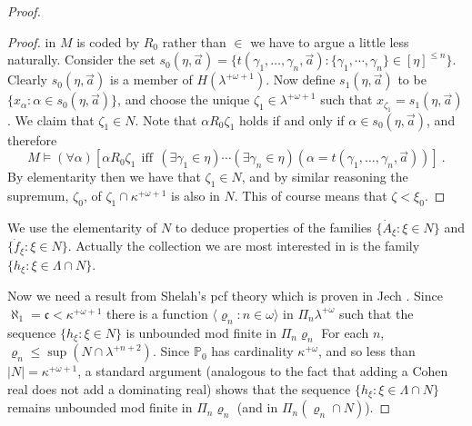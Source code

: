 \documentclass{amsart}
\theoremstyle{plain}
\theoremstyle{definition}
\theoremstyle{remark}
\theoremstyle{plain}
\theoremstyle{definition}
\theoremstyle{remark}
\begin{document}
\begin{proof}
\begin{proof}
             in $M$ is coded by $R_0$ rather than $\in$ we have to argue a little
             less naturally.
             Consider the set
               $s_0(\eta,\vec a) = \{ t(\gamma_1,\ldots, \gamma_n,\vec a) :
            \{\gamma_1,\cdots,\gamma_n\} \in [\eta]^{\leq n}\}$. Clearly
             $s_0(\eta,\vec a)$ is a member of $H(\lambda^{+\omega+1})$.
             Now define $s_1(\eta,\vec a) $ to be
             $\{ x_\alpha : \alpha\in s_0(\eta, \vec a)\}$,
             and choose the
             unique $\zeta_1\in \lambda^{+\omega+1}$ such
             that $x_{\zeta_1} = s_1(\eta,\vec a)$. We claim that $\zeta_1\in N$.
             Note that $\alpha R_0\zeta_1$ holds if and only if
              $ \alpha \in s_0(\eta,\vec a)$, and therefore
             $$M\models (\forall \alpha)\left[\alpha R_0 \zeta_1 ~~\mbox{iff}~~
             (\exists   \gamma_1\in \eta)\cdots(\exists \gamma_n\in\eta)(\alpha=
             t(\gamma_1,\ldots, \gamma_n,\vec a))\right]~.$$
             By elementarity then we have that $\zeta_1\in N$,
             and by similar reasoning the supremum, $\zeta_0$,
            of $\zeta_1\cap \kappa^{+\omega+1}$ is also in $N$.
               This of course means that $\zeta < \xi_0$.
            \end{proof}

            \egroup

            We use the elementarity of
             $N$  to deduce properties of the families
             $\{ \dot A_\xi : \xi\in N\}$ and $\{ \dot f_\xi : \xi \in
             N\}$.  Actually the collection we are most interested in
             is the family $\{ h_\xi : \xi\in \Lambda\cap N\}$.

            Now we need a result from Shelah's pcf theory which
            is proven in  Jech \cite[24.9]{MR1940513}.
             Since  $\aleph_1=\mathfrak c < \kappa^{+\omega+1}$ there
              is a function $\langle \varrho_n : n\in \omega\rangle$
              in $\Pi_n \lambda^{+\omega}   $ such that the sequence
               $\{ h_\xi : \xi \in N\}$ is unbounded mod finite
               in $\Pi_n \varrho_n$
               For each $n$, $\varrho_n \leq \sup(N\cap \lambda^{+n+2})$.
                  Since $\mathbb P_0$ has cardinality $\kappa^{+\omega}$,
            and so less than $|N|=\kappa^{+\omega+1}$, a standard argument
            (analogous to the fact that adding a Cohen real does
             not add a dominating real)
             shows that    the sequence $\{ h_\xi : \xi \in \Lambda\cap N\}$ remains
             unbounded
                mod finite in $\Pi_n \varrho_n$ (and in
                 $\Pi_n (\varrho_n\cap N)$).


\end{proof}
\end{document}
